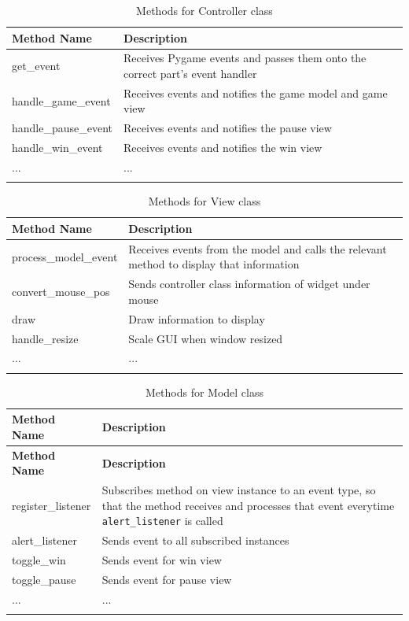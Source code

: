 \documentclass[../main/main.tex]{subfiles}
\begin{document}
\begin{longtable}[c]{l|p{}}
    \toprule
    \textbf{Method Name} & \textbf{Description}\\
    \midrule
    \endfirsthead
    \endhead

    get\_event & Receives Pygame events and passes them onto the correct part's event handler\\
    handle\_game\_event & Receives events and notifies the game model and game view\\
    handle\_pause\_event & Receives events and notifies the pause view\\
    handle\_win\_event & Receives events and notifies the win view\\
    ... & ...\\

    \bottomrule

\caption{Methods for Controller class}
\label{tab:controller-methods}
\end{longtable}

\begin{longtable}[c]{l|p{}}
    \toprule
    \textbf{Method Name} & \textbf{Description}\\
    \midrule
    \endfirsthead
    \endhead

    process\_model\_event & Receives events from the model and calls the relevant method to display that information\\
    convert\_mouse\_pos & Sends controller class information of widget under mouse\\
    draw & Draw information to display \\
    handle\_resize & Scale GUI when window resized\\
    ... & ...\\

    \bottomrule

\caption{Methods for View class}
\label{tab:view-methods}
\end{longtable}

\begin{longtable}[c]{l|p{}}
    \toprule
    \textbf{Method Name} & \textbf{Description}\\
    \midrule
    \endfirsthead
    \textbf{Method Name} & \textbf{Description}\\
    \midrule
    \endhead

    register\_listener & Subscribes method on view instance to an event type, so that the method receives and processes that event everytime \lstinline[language=Python]{alert_listener} is called\\
    alert\_listener & Sends event to all subscribed instances\\
    toggle\_win & Sends event for win view\\
    toggle\_pause & Sends event for pause view\\
    ... & ...\\

    \bottomrule

\caption{Methods for Model class}
\label{tab:model-methods}
\end{longtable}
\end{document}
